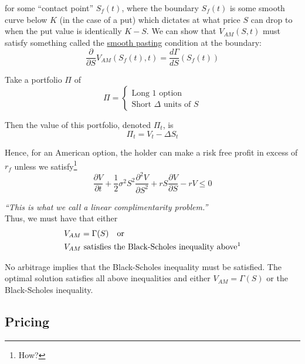 \documentclass[12pt]{article}
\newlength\tindent
\renewcommand{\indent}{\hspace*{\tindent}}
\begin{document}
for some ``contact point'' $S_f(t)$, where the boundary $S_f(t)$ is some smooth curve below $K$ (in the case of a put) which dictates at what price $S$ can drop to when the put value is identically $K - S$. We can show that $V_{AM}(S, t)$ must satisfy something called the \underline{smooth pasting} condition at the boundary:
\begin{equation*}
	\frac{\partial}{\partial S} V_{AM} \left(S_{f}(t), t\right) = \frac{d \Gamma}{dS} \left(S_f(t)\right)
\end{equation*}

Take a portfolio $\Pi$ of
\begin{equation*}
	\Pi =
	\begin{cases}
		\text{Long 1 option} \\
		\text{Short } \Delta \text{ units of } S
	\end{cases}
\end{equation*}

Then the value of this portfolio, denoted $\Pi_t$, is
\begin{equation*}
	\Pi_t = V_t - \Delta S_t
\end{equation*}
 
\indent Hence, for an American option, the holder can make a risk free profit in excess of $r_f$ unless we satisfy\footnote{How?}
\begin{equation*}
	\frac{\partial V}{\partial t} + \frac{1}{2}\sigma^2S^2 \frac{\partial^2 V}{\partial S^2} + rS\frac{\partial V}{\partial S} - rV \leq 0
\end{equation*}

{\em ``This is what we call a linear complimentarity problem.''} \\

Thus, we must have that either
\begin{align*}
	&V_{AM} = \Gamma(S) \quad \text{or} \\
	&V_{AM} \text{ satisfies the Black-Scholes inequality above\footnotemark}
\end{align*}

 \indent No arbitrage implies that the Black-Scholes inequality must be satisfied. The optimal solution satisfies all above inequalities and either $V_{AM} = \Gamma(S)$ or the Black-Scholes inequality.

\subsection{Pricing}
\end{document}
